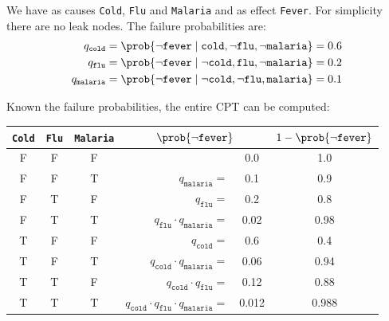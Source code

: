 \begin{example}
    We have as causes \texttt{Cold}, \texttt{Flu} and \texttt{Malaria} and as effect \texttt{Fever}.
    For simplicity there are no leak nodes.
    The failure probabilities are:
    \[
        \begin{split}
            q_\texttt{cold} &= \prob{\lnot \texttt{fever} \mid \texttt{cold}, \lnot\texttt{flu}, \lnot\texttt{malaria}} = 0.6 \\
            q_\texttt{flu} &= \prob{\lnot \texttt{fever} \mid \lnot\texttt{cold}, \texttt{flu}, \lnot\texttt{malaria}} = 0.2 \\
            q_\texttt{malaria} &= \prob{\lnot \texttt{fever} \mid \lnot\texttt{cold}, \lnot\texttt{flu}, \texttt{malaria}} = 0.1
        \end{split}    
    \]

    Known the failure probabilities, the entire CPT can be computed:
    \begin{center}
        \begin{tabular}{c|c|c|rc|c}
            \hline
            \texttt{Cold} & \texttt{Flu} & \texttt{Malaria} & \multicolumn{2}{c|}{$\prob{\lnot\texttt{fever}}$} & $1-\prob{\lnot\texttt{fever}}$ \\
            \hline
            F & F & F &                                                                 & 0.0       & 1.0 \\
            F & F & T & $q_\texttt{malaria} =$                                            & 0.1       & 0.9 \\
            F & T & F & $q_\texttt{flu} =$                                                & 0.2       & 0.8 \\
            F & T & T & $q_\texttt{flu} \cdot q_\texttt{malaria} =$                       & 0.02      & 0.98 \\
            T & F & F & $q_\texttt{cold} =$                                               & 0.6       & 0.4 \\
            T & F & T & $q_\texttt{cold} \cdot q_\texttt{malaria} =$                      & 0.06      & 0.94 \\
            T & T & F & $q_\texttt{cold} \cdot q_\texttt{flu} =$                          & 0.12      & 0.88 \\
            T & T & T & $q_\texttt{cold} \cdot q_\texttt{flu} \cdot q_\texttt{malaria} =$ & 0.012     & 0.988 \\
            \hline
        \end{tabular}
    \end{center}
\end{example}



